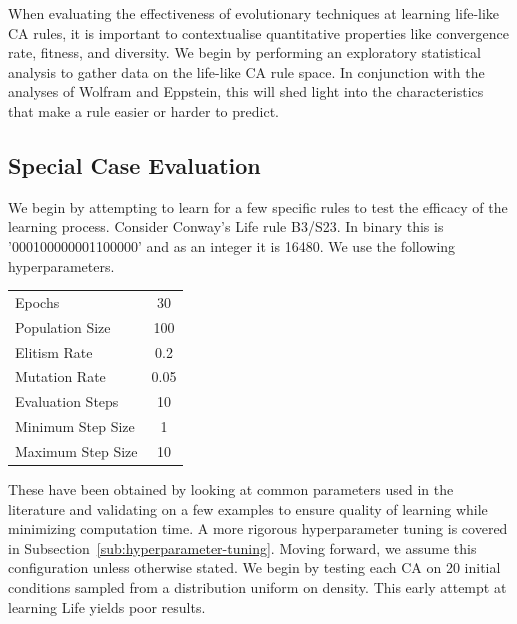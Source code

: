 When evaluating the effectiveness of evolutionary techniques at learning life-like CA rules, it is important to contextualise quantitative properties like convergence rate, fitness, and diversity. We begin by performing an exploratory statistical analysis to gather data on the life-like CA rule space. In conjunction with the analyses of Wolfram\cite{wolfram1986theory} and Eppstein\cite{eppstein2010growth}, this will shed light into the characteristics that make a rule easier or harder to predict.


\subsection{Special Case Evaluation}

We begin by attempting to learn for a few specific rules to test the efficacy of the learning process. Consider Conway's Life rule B3/S23. In binary this is '000100000001100000' and as an integer it is 16480. We use the following hyperparameters.
\begin{center}
    \begin{tabular}{ l c }
        Epochs & 30\\
        Population Size & 100\\
        Elitism Rate & 0.2\\
        Mutation Rate & 0.05\\
        Evaluation Steps & 10\\
        Minimum Step Size & 1\\
        Maximum Step Size & 10\\
    \end{tabular}
\end{center}
These have been obtained by looking at common parameters used in the literature and validating on a few examples to ensure quality of learning while minimizing computation time. A more rigorous hyperparameter tuning is covered in Subsection~\ref{sub:hyperparameter-tuning}. Moving forward, we assume this configuration unless otherwise stated. We begin by testing each CA on 20 initial conditions sampled from a distribution uniform on density. This early attempt at learning Life yields poor results.


